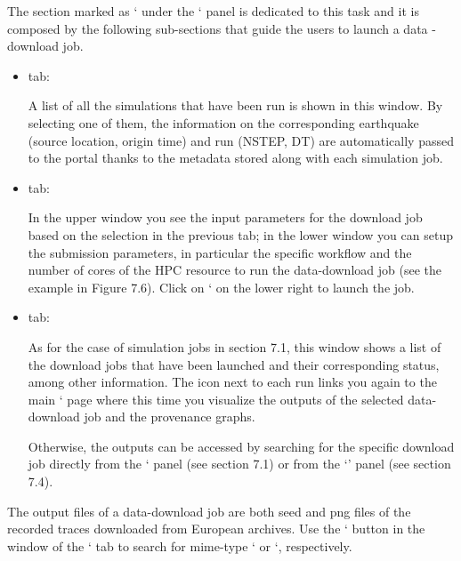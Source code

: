 \documentclass[english]{book}
\begin{document}
The section marked as ‘ under the ‘
panel is dedicated to this task and it is composed by the following
sub-sections that guide the users to launch a data -download job.
\begin{itemize}
\item {} 
 tab:

A list of all the simulations that have been run is shown in this
window. By selecting one of them, the information on the corresponding
earthquake (source location, origin time) and run (NSTEP, DT) are
automatically passed to the portal thanks to the metadata stored along
with each simulation job.

\item {} 
 tab:

In the upper window you see the input parameters for the download job
based on the selection in the previous tab; in the lower window you can
setup the submission parameters, in particular the specific workflow and
the number of cores of the HPC resource to run the data-download job
(see the example in Figure 7.6). Click on ‘ on the lower
right to launch the job.

\item {} 
 tab:

As for the case of simulation jobs in section 7.1, this window shows a
list of the download jobs that have been launched and their
corresponding status, among other information. The  icon
next to each run links you again to the main ‘ page where
this time you visualize the outputs of the selected data-download job
and the provenance graphs.

Otherwise, the outputs can be accessed by searching for the specific
download job directly from the ‘ panel (see section 7.1) or
from the ‘’ panel (see section 7.4).

\end{itemize}

The output files of a data-download job are both seed and png files of
the recorded traces downloaded from European archives. Use the
‘ button in the  window of the ‘
tab to search for mime-type ‘ or
‘, respectively.
\end{document}

